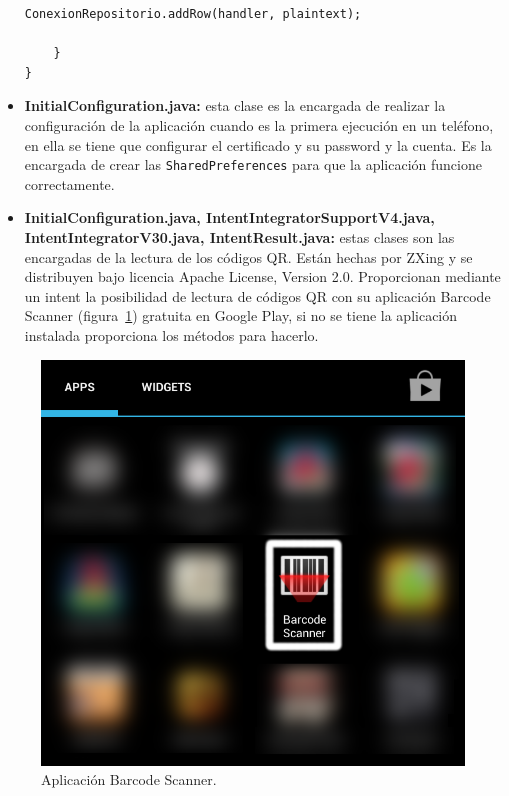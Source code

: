 \begin{itemize}
\begin{lstlisting}[style=Java]
		ConexionRepositorio.addRow(handler, plaintext);
		
	}
}
\end{lstlisting} 

\item \textbf{InitialConfiguration.java:} esta clase es la encargada de realizar la configuración de la aplicación cuando es la primera ejecución en un teléfono, en ella se tiene que configurar el certificado y su password y la cuenta. Es la encargada de crear las \lstinline{SharedPreferences} para que la aplicación funcione correctamente.

\item \textbf{InitialConfiguration.java, IntentIntegratorSupportV4.java, IntentIntegratorV30.java, IntentResult.java:} estas clases son las encargadas de la lectura de los códigos QR. Están hechas por ZXing y se distribuyen bajo licencia Apache License, Version 2.0. Proporcionan mediante un intent la posibilidad de lectura de códigos QR con su aplicación Barcode Scanner (figura~\ref{fig:barcodeScanner}) gratuita en Google Play, si no se tiene la aplicación instalada proporciona los métodos para hacerlo.
\end{itemize}

\begin{figure}
  \centering
    \includegraphics[scale=0.3]{./Android/imagenes/barcodeScanner.png}
  \caption{Aplicación Barcode Scanner.}
  \label{fig:barcodeScanner}
\end{figure}

